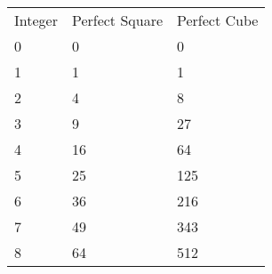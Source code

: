           \begin{table}[H]
        \begin{center}
      \label{m38347*uid1}
    \noindent
      \tablelasttail{}
      \begin{xtabular}[t]{|l|l|l|}\hline
        Integer &
        Perfect Square &
        Perfect Cube%
     \tabularnewline{}
        0 &
        0 &
        0%
     \tabularnewline{}
        1 &
        1 &
        1%
     \tabularnewline{}
        2 &
        4 &
        8%
     \tabularnewline{}
        3 &
        9 &
        27%
     \tabularnewline{}
        4 &
        16 &
        64%
     \tabularnewline{}
        5 &
        25 &
        125%
     \tabularnewline{}
        6 &
        36 &
        216%
     \tabularnewline{}
        7 &
        49 &
        343%
     \tabularnewline{}
        8 &
        64 &
        512%
     \tabularnewline{}

\end{xtabular}
\end{center}
\end{table}
